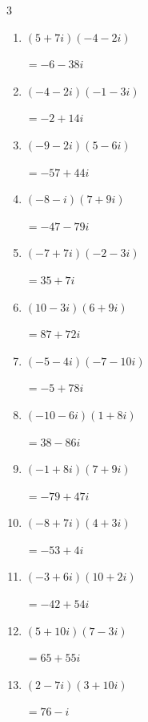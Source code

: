 \begin{multicols}{3}
\begin{enumerate}
        $\displaystyle =61+33i$

  \item $\displaystyle (5+7i)(-4-2i)$

        $\displaystyle =-6-38i$

\columnbreak %

  \item $\displaystyle (-4-2i)(-1-3i)$

        $\displaystyle =-2+14i$

  \item $\displaystyle (-9-2i)(5-6i)$

        $\displaystyle =-57+44i$

  \item $\displaystyle (-8-i)(7+9i)$

        $\displaystyle =-47-79i$

  \item $\displaystyle (-7+7i)(-2-3i)$

        $\displaystyle =35+7i$

  \item $\displaystyle (10-3i)(6+9i)$

        $\displaystyle =87+72i$

  \item $\displaystyle (-5-4i)(-7-10i)$

        $\displaystyle =-5+78i$

  \item $\displaystyle (-10-6i)(1+8i)$

        $\displaystyle =38-86i$

  \item $\displaystyle (-1+8i)(7+9i)$

        $\displaystyle =-79+47i$

  \item $\displaystyle (-8+7i)(4+3i)$

        $\displaystyle =-53+4i$

  \item $\displaystyle (-3+6i)(10+2i)$

        $\displaystyle =-42+54i$

  \item $\displaystyle (5+10i)(7-3i)$

        $\displaystyle =65+55i$

  \item $\displaystyle (2-7i)(3+10i)$

        $\displaystyle =76-i$


\end{enumerate}
\end{multicols}
